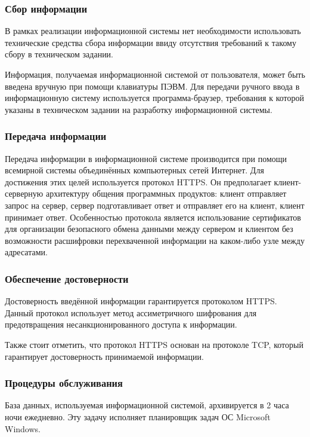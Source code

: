 \subsubsection{Сбор информации}

В рамках реализации информационной системы нет необходимости использовать технические средства сбора информации ввиду отсутствия требований к такому сбору в техническом задании.

Информация, получаемая информационной системой от пользователя, может быть введена вручную при помощи клавиатуры ПЭВМ.
Для передачи ручного ввода в информационную систему используется программа-браузер, требования к которой указаны в техническом задании на разработку информационной системы.

\subsubsection{Передача информации}

Передача информации в информационной системе производится при помощи всемирной системы объединённых компьютерных сетей Интернет.
Для достижения этих целей используется протокол HTTPS.
Он предполагает клиент-серверную архитектуру общения программных продуктов: клиент отправляет запрос на сервер, сервер подготавливает ответ и отправляет его на клиент, клиент принимает ответ.
Особенностью протокола является использование сертификатов для организации безопасного обмена данными между сервером и клиентом без возможности расшифровки перехваченной информации на каком-либо узле между адресатами.

\subsubsection{Обеспечение достоверности}

Достоверность введённой информации гарантируется протоколом HTTPS.
Данный протокол использует метод ассиметричного шифрования для предотвращения несанкционированного доступа к информации.

Также стоит отметить, что протокол HTTPS основан на протоколе TCP, который гарантирует достоверность принимаемой информации.

\subsubsection{Процедуры обслуживания}

База данных, используемая информационной системой, архивируется в 2 часа ночи ежедневно.
Эту задачу исполняет планировщик задач ОС Microsoft Windows.


